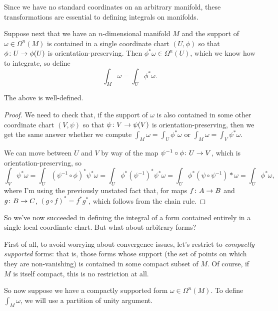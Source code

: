 Since we have no standard coordinates on an arbitrary manifold, these transformations are essential to defining integrals on manifolds.

Suppose next that we have an $n$-dimensional manifold $M$ and the support of $\omega \in \Omega^n(M)$ is contained in a single coordinate chart $(U,\phi)$ so that $\phi \colon\thinspace\! U \to \phi(U)$ is orientation-preserving. Then $\phi^\ast \omega \in \Omega^n(U)$, which we know how to integrate, so define
\[
	\int_M\omega = \int_U \phi^\ast \omega.
\]

\begin{proposition}\label{prop:local integral well-defined}
	The above is well-defined.
\end{proposition}

\begin{proof}
	We need to check that, if the support of $\omega$ is also contained in some other coordinate chart $(V, \psi)$ so that $\psi \colon\thinspace\! V \to \psi(V)$ is orientation-preserving, then we get the same answer whether we compute $\int_M \omega = \int_U \phi^\ast \omega$ or $\int_M \omega = \int_V \psi^\ast \omega$.
	
	We can move between $U$ and $V$ by way of the map $\psi^{-1} \circ \phi \colon\thinspace\! U \to V$, which is orientation-preserving, so
	\[
		\int_V \psi^\ast \omega = \int_U(\psi^{-1} \circ \phi)^\ast \psi^\ast \omega = \int_U \phi^\ast (\psi^{-1})^\ast \psi^\ast \omega = \int_U \phi^\ast (\psi \circ \psi^{-1})\ast \omega = \int_U \phi^\ast \omega ,
	\]
	where I'm using the previously unstated fact that, for maps $f \colon\thinspace\! A \to B$ and $g \colon\thinspace\! B \to C$, $(g \circ f)^\ast = f^\ast g^\ast$, which follows from the chain rule.
\end{proof}

So we've now succeeded in defining the integral of a form contained entirely in a single local coordinate chart. But what about arbitrary forms?

First of all, to avoid worrying about convergence issues, let's restrict to \emph{compactly supported} forms: that is, those forms whose support (the set of points on which they are non-vanishing) is contained in some compact subset of $M$. Of course, if $M$ is itself compact, this is no restriction at all.

So now suppose we have a compactly supported form $\omega \in \Omega^n(M)$. To define $\int_M \omega$, we will use a partition of unity argument.

